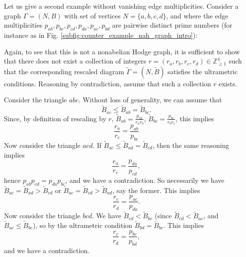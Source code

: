 \documentclass[11pt,a4paper]{amsart}
\numberwithin{equation}{section}
\begin{document}
\begin{example}
\label{ex:other_example_not_nah_graph}
Let us give a second example without vanishing edge multiplicities. Consider a graph $\Gamma=(N, B)$ with set of vertices $N=\{a, b, c,d\}$, and where the edge multiplicities $p_{ab}, p_{bc}, p_{cd}, p_{da},p_{ac}, p_{bd}$ are pairwise distinct prime numbers (for instance as in Fig. \ref{subfig:counter_example_nah_graph_intro}):

\begin{center}
\end{center}



Again, to see that this is not a nonabelian Hodge graph, it is sufficient to show that there does not exist a collection of integers $r=(r_a, r_b, r_c, r_d)\in \mathbb Z_{\geq 1}^4$ such that the corresponding rescaled diagram $\widetilde{\Gamma}=(N,\widetilde B)$ satisfies the ultrametric conditions. Reasoning by contradiction, assume that such a collection $r$ exists. 

Consider the triangle $abc$. Without loss of generality, we can assume that 
\[
\widetilde B_{ac}\leq \widetilde B_{ab}=\widetilde B_{bc}.
\]
Since, by definition of rescaling by $r$, $\widetilde B_{ab}=\frac{p_{ab}}{r_a r_b}$, $\widetilde B_{bc}=\frac{p_{bc}}{r_b r_c}$,
this implies
\[
\frac{r_a}{r_c}=\frac{p_{ab}}{p_{bc}}
\]  
Now consider the triangle $acd$. If $\widetilde B_{ac}\leq \widetilde B_{ad}=\widetilde B_{cd}$, then the same reasoning implies 
\[
\frac{r_a}{r_c}=\frac{p_{da}}{p_{cd}},
\] 
hence $p_{ab}p_{cd}=p_{da}p_{bc}$, and we have a contradiction. So necessarily we have $\widetilde B_{ac}=\widetilde B_{ad}>\widetilde B_{cd}$ or $\widetilde B_{ac}=\widetilde B_{cd}>\widetilde B_{ad}$, say the former. This implies
\[
\frac{r_c}{r_d}=\frac{p_{ac}}{p_{da}}.
\]
Now consider the triangle $bcd$. We have $\widetilde B_{cd}< \widetilde B_{bc}$ (since $\widetilde B_{cd}<\widetilde B_{ac}$, and $\widetilde B_{ac}\leq \widetilde B_{bc}$), so by the ultrametric condition $\widetilde B_{bd}=\widetilde B_{bc}$. This implies
\[
\frac{r_c}{r_d}=\frac{p_{bc}}{p_{bd}},
\]
and we have a contradiction.
\end{example}
\end{document}

